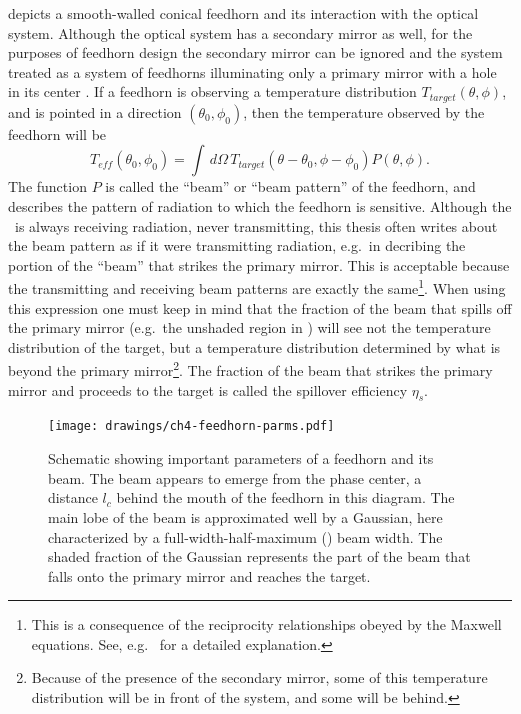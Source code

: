  depicts a smooth-walled conical feedhorn and its interaction with the optical system.
Although the optical system has a secondary mirror as well, for the purposes of feedhorn design the secondary mirror can be ignored and the system treated as a system of feedhorns illuminating only a primary mirror with a hole in its center \cite{xxxgoldsmith}.
If a feedhorn is observing a temperature distribution $T_{target}(\theta,\phi)$, and is pointed in a direction $(\theta_0, \phi_0)$, then the temperature observed by the feedhorn will be
\begin{equation}
    T_{eff}(\theta_0,\phi_0) = \int \, d \Omega \, T_{target}(\theta - \theta_0,\phi - \phi_0) P(\theta,\phi).
\end{equation}
The function $P$ is called the ``beam'' or ``beam pattern'' of the feedhorn, and describes the pattern of radiation to which the feedhorn is sensitive.
Although the \Imager\ is always receiving radiation, never transmitting, this thesis often writes about the beam pattern as if it were transmitting radiation, e.g.\ in decribing the portion of the ``beam'' that strikes the primary mirror.
This is acceptable because the transmitting and receiving beam patterns are exactly the same\footnote{This is a consequence of the reciprocity relationships obeyed by the Maxwell equations. See, e.g.\ \cite{balanis_antenna_2005} for a detailed explanation.}.
When using this expression one must keep in mind that the fraction of the beam that spills off the primary mirror (e.g.\ the unshaded region in ) will see not the temperature distribution of the target, but a temperature distribution determined by what is beyond the primary mirror\footnote{Because of the presence of the secondary mirror, some of this temperature distribution will be in front of the system, and some will be behind.}.
The fraction of the beam that strikes the primary mirror and proceeds to the target is called the spillover efficiency $\eta_s$.

\begin{figure}
\centering
\texttt{[image: drawings/ch4-feedhorn-parms.pdf]}
\caption{Schematic showing important parameters of a feedhorn and its beam. The beam appears to emerge from the phase center, a distance $l_c$ behind the mouth of the feedhorn in this diagram. The main lobe of the beam is approximated well by a Gaussian, here characterized by a full-width-half-maximum (\FWHM) beam width. The shaded fraction of the Gaussian represents the part of the beam that falls onto the primary mirror and reaches the target.}
\label{fig:feedhorn-parms}
\end{figure}


